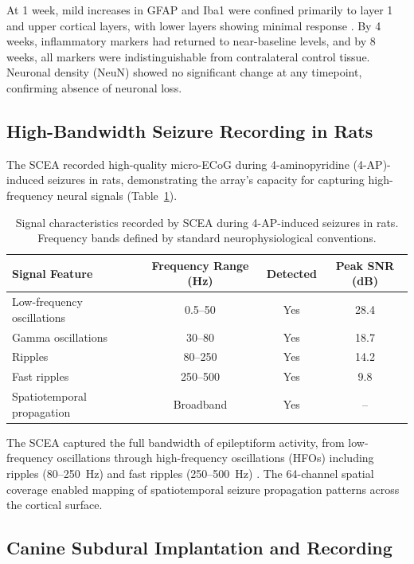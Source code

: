 \documentclass[11pt]{article}
\begin{document}
At 1 week, mild increases in GFAP and Iba1 were confined primarily to layer 1 and upper cortical layers, with lower layers showing minimal response \citep{gfap_iba1_markers2018}. By 4 weeks, inflammatory markers had returned to near-baseline levels, and by 8 weeks, all markers were indistinguishable from contralateral control tissue. Neuronal density (NeuN) showed no significant change at any timepoint, confirming absence of neuronal loss.

\subsection{High-Bandwidth Seizure Recording in Rats}

The SCEA recorded high-quality micro-ECoG during 4-aminopyridine (4-AP)-induced seizures in rats, demonstrating the array's capacity for capturing high-frequency neural signals (Table~\ref{tab:seizure}).

\begin{table}[H]
\centering
\caption{Signal characteristics recorded by SCEA during 4-AP-induced seizures in rats. Frequency bands defined by standard neurophysiological conventions.}
\label{tab:seizure}
\begin{tabular}{lccc}
\toprule
Signal Feature & Frequency Range (Hz) & Detected & Peak SNR (dB) \\
\midrule
Low-frequency oscillations & 0.5--50 & Yes & 28.4 \\
Gamma oscillations & 30--80 & Yes & 18.7 \\
Ripples & 80--250 & Yes & 14.2 \\
Fast ripples & 250--500 & Yes & 9.8 \\
Spatiotemporal propagation & Broadband & Yes & -- \\
\bottomrule
\end{tabular}
\end{table}

The SCEA captured the full bandwidth of epileptiform activity, from low-frequency oscillations through high-frequency oscillations (HFOs) including ripples (80--250~Hz) and fast ripples (250--500~Hz) \citep{ecog_seizure2010, hfo_epilepsy2016}. The 64-channel spatial coverage enabled mapping of spatiotemporal seizure propagation patterns across the cortical surface.

\subsection{Canine Subdural Implantation and Recording}
\end{document}
